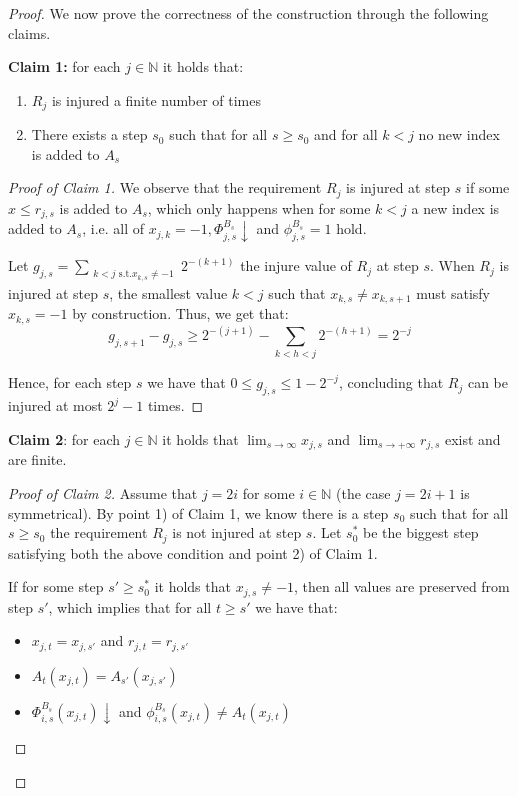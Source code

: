 \documentclass[12pt,a4paper]{article}
\theoremstyle{definition}
\newcommand{\N}{\mathbb{N}}                     %
\begin{document}
\begin{proof}
    We now prove the correctness of the construction through the following claims.

    \textbf{Claim 1:} for each $j \in \N$ it holds that:
    \begin{enumerate}
        \item $R_j$ is injured a finite number of times
        \item There exists a step $s_0$ such that for all $s \geq s_0$ and for all $k < j$ no new index is added to $A_s$
    \end{enumerate}

    \begin{proof}[Proof of Claim 1]
        We observe that the requirement $R_j$ is injured at step $s$ if some $x \leq r_{j,s}$ is added to $A_s$, which only happens when for some $k < j$ a new index is added to $A_s$, i.e. all of $x_{j,k} = -1, \Phi_{j,s}^{B_s} \downarrow$ and $\phi_{j,s}^{B_s} = 1$ hold.

        Let $g_{j,s} = \sum_{\substack{k < j \text{ s.t.} x_{k,s} \neq -1}} 2^{-(k+1)}$ the injure value of $R_j$ at step $s$. When $R_j$ is injured at step $s$, the smallest value $k < j$ such that $x_{k,s} \neq x_{k,s+1}$ must satisfy $x_{k,s} = -1$ by construction. Thus, we get that:
        \[g_{j,s+1} - g_{j,s} \geq 2^{-(j+1)} - \sum_{k < h < j} 2^{-(h+1)} = 2^{-j}\]

        Hence, for each step $s$ we have that $0 \leq g_{j,s} \leq 1-2^{-j}$, concluding that $R_j$ can be injured at most $2^{j}-1$ times.
    \end{proof}

    \textbf{Claim 2}: for each $j \in \N$ it holds that $\lim_{s \to \infty} x_{j,s}$ and $\lim_{s \to +\infty} r_{j,s}$ exist and are finite.

    \begin{proof}[Proof of Claim 2]
        Assume that $j = 2i$ for some $i \in \N$ (the case $j = 2i+1$ is symmetrical). By point 1) of Claim 1, we know there is a step $s_0$ such that for all $s \geq s_0$ the requirement $R_j$ is not injured at step $s$. Let $s_0^*$ be the biggest step satisfying both the above condition and point 2) of Claim 1.
        
        If for some step $s' \geq s_0^*$ it holds that $x_{j,s} \neq -1$, then all values are preserved from step $s'$, which implies that for all $t \geq s'$ we have that:
        \begin{itemize}
            \item $x_{j,t} = x_{j,s'}$ and $r_{j,t} = r_{j,s'}$
            \item $A_t(x_{j,t}) = A_{s'}(x_{j,s'})$
            \item $\Phi_{i, s}^{B_s}(x_{j,t}) \downarrow$ and $\phi_{i, s}^{B_s}(x_{j,t}) \neq A_{t}(x_{j,t})$
        \end{itemize}


\end{proof}
\end{proof}
\end{document}
